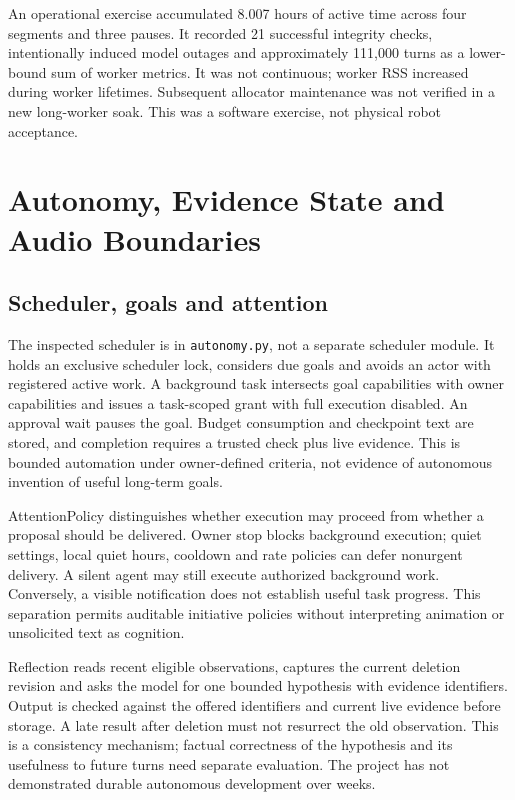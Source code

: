 \documentclass[11pt,a4paper]{article}
\begin{document}
An operational exercise accumulated 8.007 hours of active time across four segments and three pauses. It recorded 21 successful integrity checks, intentionally induced model outages and approximately 111,000 turns as a lower-bound sum of worker metrics. It was not continuous; worker RSS increased during worker lifetimes. Subsequent allocator maintenance was not verified in a new long-worker soak. This was a software exercise, not physical robot acceptance.



\section{Autonomy, Evidence State and Audio Boundaries}\label{sec:deep}
\subsection{Scheduler, goals and attention}
The inspected scheduler is in \texttt{autonomy.py}, not a separate scheduler module. It holds an exclusive scheduler lock, considers due goals and avoids an actor with registered active work. A background task intersects goal capabilities with owner capabilities and issues a task-scoped grant with full execution disabled. An approval wait pauses the goal. Budget consumption and checkpoint text are stored, and completion requires a trusted check plus live evidence. This is bounded automation under owner-defined criteria, not evidence of autonomous invention of useful long-term goals.

AttentionPolicy distinguishes whether execution may proceed from whether a proposal should be delivered. Owner stop blocks background execution; quiet settings, local quiet hours, cooldown and rate policies can defer nonurgent delivery. A silent agent may still execute authorized background work. Conversely, a visible notification does not establish useful task progress. This separation permits auditable initiative policies without interpreting animation or unsolicited text as cognition.

Reflection reads recent eligible observations, captures the current deletion revision and asks the model for one bounded hypothesis with evidence identifiers. Output is checked against the offered identifiers and current live evidence before storage. A late result after deletion must not resurrect the old observation. This is a consistency mechanism; factual correctness of the hypothesis and its usefulness to future turns need separate evaluation. The project has not demonstrated durable autonomous development over weeks.
\end{document}
